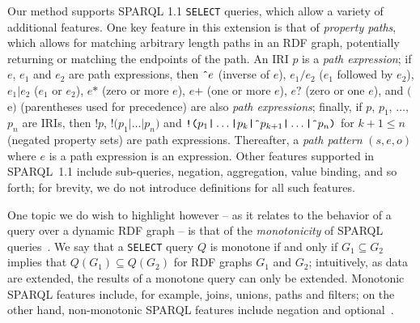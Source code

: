 \documentclass[runningheads]{llncs}
\begin{document}
Our method supports SPARQL 1.1 \texttt{SELECT} queries, which allow a variety of additional features. One key feature in this extension is that of \textit{property paths}, which allows for matching arbitrary length paths in an RDF graph, potentially returning or matching the endpoints of the path. An IRI $p$ is a \emph{path expression}; if $e$, $e_1$ and $e_2$ are path expressions, then $\texttt{\^{}}e$ (inverse of $e$), $e_1 \texttt{/} e_2$ ($e_1$ followed by $e_2$), $e_1 \texttt{|} e_2$ ($e_1$ or $e_2$), $e\texttt{*}$ (zero or more $e$), $e\texttt{+}$ (one or more $e$), $e\texttt{?}$ (zero or one $e$), and $\texttt{(}$e$\texttt{)}$ (parentheses used for precedence) are also \textit{path expressions}; finally, if $p$, $p_1$, $\ldots,$ $p_n$ are IRIs, then $\texttt{!}p$, $\texttt{!}\texttt{(}p_1 \texttt{|} \ldots \texttt{|} p_n\texttt{)}$ and $\texttt{!}\texttt{(}p_1 \texttt{|} \ldots \texttt{|} p_k \texttt{|}  \texttt{{\^{}}}p_{k+1} \texttt{|} \ldots \texttt{|} \texttt{{\^{}}}p_n\texttt{)}$ for $k+1 \leq n$ (negated property sets) are path expressions. Thereafter, a \textit{path pattern} $(s,e,o)$ where $e$ is a path expression is an expression. Other features supported in SPARQL~1.1 include sub-queries, negation, aggregation, value binding, and so forth; for brevity, we do not introduce definitions for all such features.

One topic we do wish to highlight however -- as it relates to the behavior of a query over a dynamic RDF graph -- is that of the \emph{monotonicity} of SPARQL queries~\cite{ArenasP11,ArenasU17}. We say that a \texttt{SELECT} query $Q$ is monotone if and only if $G_1 \subseteq G_2$ implies that $Q(G_1) \subseteq Q(G_2)$ for RDF graphs $G_1$ and $G_2$; intuitively, as data are extended, the results of a monotone query can only be extended. Monotonic SPARQL features include, for example, joins, unions, paths and filters; on the other hand, non-monotonic SPARQL features include negation and optional~\cite{ArenasP11}.
\end{document}
